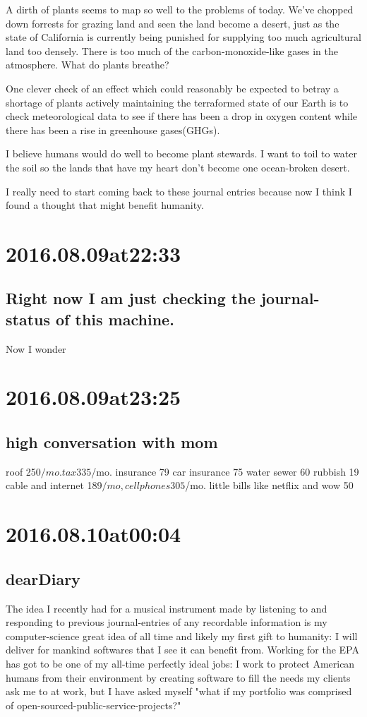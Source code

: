 \begin{enumerate}
\begin{enumerate}
A dirth of plants seems to map so well to the problems of today. We've chopped down forrests for grazing land and seen the land become a desert, just as the state of California is currently being punished for supplying too much agricultural land too densely. There is too much of the carbon-monoxide-like gases in the atmosphere. What do plants breathe?

One clever check of an effect which could reasonably be expected to betray a shortage of plants actively maintaining the terraformed state of our Earth is to check meteorological data to see if there has been a drop in oxygen content while there has been a rise in greenhouse gases(GHGs).

I believe humans would do well to become plant stewards. I want to toil to water the soil so the lands that have my heart don't become one ocean-broken desert.

I really need to start coming back to these journal entries because now I think I found a thought that might benefit humanity.

\section*{ 2016.08.09at22:33 }
\subsection*{ Right now I am just checking the journal-status of this machine. }
Now I wonder 

\section*{ 2016.08.09at23:25 }
\subsection*{ high conversation with mom }
roof 250$/mo.
tax 335$/mo.
insurance 79
car insurance 75
water sewer 60
rubbish 19
cable and internet 189$/mo,
cell phones 305$/mo.
little bills like netflix and wow 50

\section*{ 2016.08.10at00:04 }
\subsection*{ dearDiary }
The idea I recently had for a musical instrument made by listening to and responding to previous journal-entries of any recordable information is my computer-science great idea of all time and likely my first gift to humanity: I will deliver for mankind softwares that I see it can benefit from. Working for the EPA has got to be one of my all-time perfectly ideal jobs: I work to protect American humans from their environment by creating software to fill the needs my clients ask me to at work, but I have asked myself "what if my portfolio was comprised of open-sourced-public-service-projects?"


\end{enumerate}
\end{enumerate}
